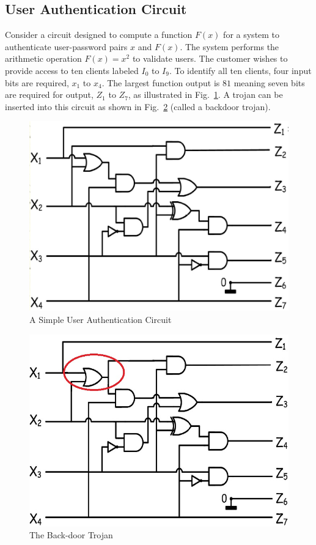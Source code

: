 \documentclass[conference]{IEEEtran}
\begin{document}
\subsection{User Authentication Circuit} \label{sec:userAuthentication}
Consider a circuit designed to compute a function $F(x)$ for a system to authenticate user-password pairs $x$ and $F(x)$.
The system performs the arithmetic operation $F(x) = x^2$ to validate users.
The customer wishes to provide access to ten clients labeled $I_0$ to $I_9$.
To identify all ten clients, four input bits are required, $x_1$ to $x_4$.
The largest function output is $81$ meaning seven bits are required for output, $Z_1$ to $Z_7$, as illustrated in Fig.~\ref{fig:userAuthenticationCircuit}.
A trojan can be inserted into this circuit as shown in Fig.~\ref{fig:userAuthenticationCircuitTrojan} (called a backdoor trojan).
\begin{figure}[h]
	\centering
	\includegraphics[width=0.7\linewidth]{Figures/circuit1}
	\caption{A Simple User Authentication Circuit}
	\label{fig:userAuthenticationCircuit}
\end{figure}
\begin{figure}[h]
	\centering
	\includegraphics[width=0.7\linewidth]{Figures/circuit2}
	\caption{The Back-door Trojan}
	\label{fig:userAuthenticationCircuitTrojan}
\end{figure}
\end{document}
